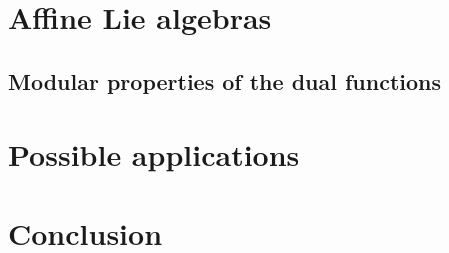 \documentclass[a4paper,12pt]{article}
\theoremstyle{definition} \newtheorem{Def}{Definition}
\begin{document}
\section{Affine Lie algebras}
\label{sec:affine-lie-algebras}

\subsection{Modular properties of the dual functions}
\label{sec:modul-prop-dual}

\section{Possible applications}
\label{sec:poss-appl}

\section{Conclusion}
\label{sec:conclusion}



{}

\end{document}
